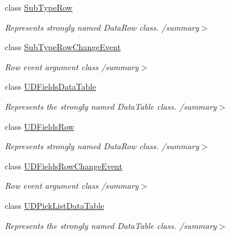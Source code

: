 \begin{DoxyCompactItemize}
class \hyperlink{class_env_int_1_1_win32_1_1_field_tech_1_1_manager_1_1_data_sets_1_1_guide_ware_mobile_data_set_1_1_sub_type_row}{Sub\+Type\+Row}
\begin{DoxyCompactList}\small\item\em Represents strongly named Data\+Row class. /summary$>$ \end{DoxyCompactList}\item 
class \hyperlink{class_env_int_1_1_win32_1_1_field_tech_1_1_manager_1_1_data_sets_1_1_guide_ware_mobile_data_set_1_1_sub_type_row_change_event}{Sub\+Type\+Row\+Change\+Event}
\begin{DoxyCompactList}\small\item\em Row event argument class /summary$>$ \end{DoxyCompactList}\item 
class \hyperlink{class_env_int_1_1_win32_1_1_field_tech_1_1_manager_1_1_data_sets_1_1_guide_ware_mobile_data_set_1_1_u_d_fields_data_table}{U\+D\+Fields\+Data\+Table}
\begin{DoxyCompactList}\small\item\em Represents the strongly named Data\+Table class. /summary$>$ \end{DoxyCompactList}\item 
class \hyperlink{class_env_int_1_1_win32_1_1_field_tech_1_1_manager_1_1_data_sets_1_1_guide_ware_mobile_data_set_1_1_u_d_fields_row}{U\+D\+Fields\+Row}
\begin{DoxyCompactList}\small\item\em Represents strongly named Data\+Row class. /summary$>$ \end{DoxyCompactList}\item 
class \hyperlink{class_env_int_1_1_win32_1_1_field_tech_1_1_manager_1_1_data_sets_1_1_guide_ware_mobile_data_set_1_1_u_d_fields_row_change_event}{U\+D\+Fields\+Row\+Change\+Event}
\begin{DoxyCompactList}\small\item\em Row event argument class /summary$>$ \end{DoxyCompactList}\item 
class \hyperlink{class_env_int_1_1_win32_1_1_field_tech_1_1_manager_1_1_data_sets_1_1_guide_ware_mobile_data_set_1_1_u_d_pick_list_data_table}{U\+D\+Pick\+List\+Data\+Table}
\begin{DoxyCompactList}\small\item\em Represents the strongly named Data\+Table class. /summary$>$ \end{DoxyCompactList}\item 

\end{DoxyCompactItemize}

